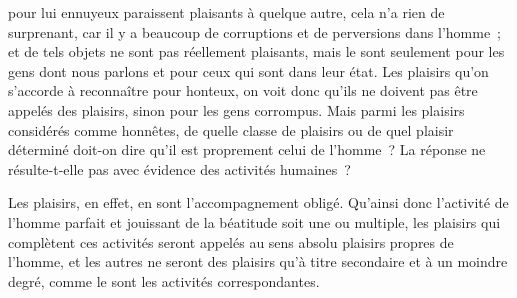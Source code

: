 \documentclass[french,twoside]{book} %
\begin{document}
pour lui ennuyeux paraissent plaisants à quelque autre, cela n’a rien de surprenant, car il y a beaucoup de corruptions et de perversions dans l’homme ; et de tels objets ne sont pas réellement plaisants, mais le sont seulement pour les gens dont nous parlons et pour ceux qui sont dans leur état. Les plaisirs qu’on s’accorde à reconnaître pour honteux, on voit donc qu’ils ne doivent pas être appelés des plaisirs, sinon pour les gens corrompus. Mais parmi les plaisirs considérés comme honnêtes, de quelle classe de plaisirs ou de quel plaisir \\
déterminé doit-on dire qu’il est proprement celui de l’homme ? La réponse ne résulte-t-elle pas avec évidence des activités humaines ?\par
Les plaisirs, en effet, en sont l’accompagnement obligé. Qu’ainsi donc l’activité de l’homme parfait et jouissant de la béatitude soit une ou multiple, les plaisirs qui complètent ces activités seront appelés au sens absolu plaisirs propres de l’homme, et les autres ne seront des plaisirs qu’à titre secondaire et à un moindre degré, comme le sont les activités correspondantes.
\end{document}
